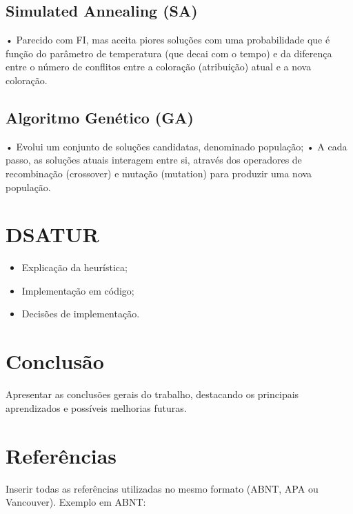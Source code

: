 \documentclass[12pt,a4paper]{article}
\begin{document}
\subsection{Simulated Annealing (SA)}
• Parecido com FI, mas aceita piores soluções com uma probabilidade que é
função do parâmetro de temperatura (que decai com o tempo) e da diferença
entre o número de conflitos entre a coloração (atribuição) atual e a nova
coloração.

\subsection{Algoritmo Genético (GA)}
• Evolui um conjunto de soluções candidatas, denominado população;
• A cada passo, as soluções atuais interagem entre si, através dos operadores
de recombinação (crossover) e mutação (mutation) para produzir uma nova
população.

\section{DSATUR}
\begin{itemize}
\item Explicação da heurística;
\item Implementação em código;
\item Decisões de implementação.
\end{itemize}


\section{Conclusão}
Apresentar as conclusões gerais do trabalho, destacando os principais aprendizados e possíveis melhorias futuras.

\section*{Referências}

Inserir todas as referências utilizadas no mesmo formato (ABNT, APA ou Vancouver).  
Exemplo em ABNT:

\end{document}

